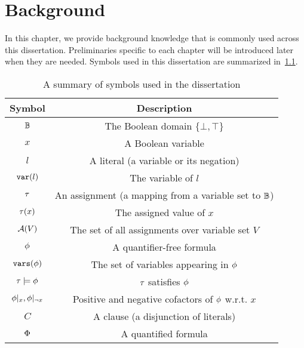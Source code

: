 \chapter{Background}
\label{chap:background}

In this chapter, we provide background knowledge that is commonly used across this dissertation.
Preliminaries specific to each chapter will be introduced later when they are needed.
Symbols used in this dissertation are summarized in~\cref{tbl:symbols}.

\begin{table}[t]
    \centering
    \caption{A summary of symbols used in the dissertation}
    \label{tbl:symbols}
    \begin{tabular}{c|c}
        Symbol                      & Description                                                 \\
        \hline
        $\mathbb{B}$                  & The Boolean domain $\{\bot,\top\}$                          \\
        $x$                         & A Boolean variable                                          \\
        $l$                         & A literal (a variable or its negation)                      \\
        $\mathtt{var}(l)$                    & The variable of $l$                                         \\
        $\tau$                       & An assignment (a mapping from a variable set to $\mathbb{B}$) \\
        $\tau(x)$                    & The assigned value of $x$                                   \\
        $\mathcal{A}(V)$                    & The set of all assignments over variable set $V$            \\
        $\phi$                       & A quantifier-free formula                                   \\
        $\mathtt{vars}(\phi)$                  & The set of variables appearing in $\phi$                     \\
        $\tau\models\phi$             & $\tau$ satisfies $\phi$                                       \\
        $\phi|_{x},\phi|_{\lnot x}$ & Positive and negative cofactors of $\phi$ w.r.t. $x$         \\
        $C$                         & A clause (a disjunction of literals)                        \\
        $\Phi$                       & A quantified formula                                        \\
    \end{tabular}
\end{table}







